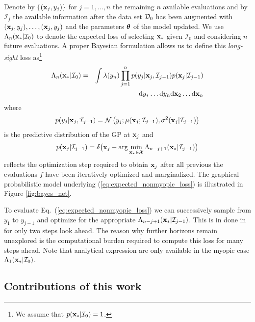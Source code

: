 \documentclass[twoside]{article}
\newcommand{\I}{\mathcal{I}}
\newcommand{\ud}{\mathrm{d}}
\begin{document}
Denote by $\{(\mathbf{x}_j,y_j)\}$ for $j=1,\dots,n$ the remaining $n$ available evaluations and by $\I_j$ the available information after the data set $\mathcal{D}_0$ has been augmented with $(\mathbf{x}_j,y_j),\dots,(\mathbf{x}_j,y_j)$ and the parameters $\boldsymbol{\theta}$ of the model updated. We use $\Lambda_n(\latentVector_*|\I_0 )$ to denote the expected loss of selecting $\mathbf{x}_*$ given $\I_0$ and  considering $n$ future evaluations.  A proper Bayesian formulation allows us to define this \emph{long-sight} loss  \citep{osborne_bayesian_2010}  as\footnote{We assume that $p(\latentVector_*|\I_0)=1$.}
\begin{eqnarray}\nonumber
\Lambda_n(\latentVector_*|\I_0 ) &= & \int \lambda(y_n) \prod_{j=1}^{n}p(y_{j}|\latentVector_{j},\I_{j-1}) p(\latentVector_{j}|\I_{j-1})\\\label{eq:expected_nonmyopic_loss}
& & \ud y_*\dots \ud y_n \ud\latentVector_2\dots \ud\latentVector_n
\end{eqnarray}
where 
$$p(y_{j}|\latentVector_{j},\I_{j-1})= \mathcal{N} \left(y_{j};\mu(\latentVector_{j};\I_{j-1}),\sigma^2(\latentVector_{j}|\I_{j-1} ) \right)$$ 
is the predictive distribution of the GP at $\mathbf{x}_{j}$  and 
$$p(\latentVector_{j}|\I_{j-1}) = \delta \bigr(\latentVector_{j} - \arg \min_{\latentVector_* \in {\mathcal X}} \Lambda_{n-j+1}(\latentVector_*|\I_{j-1})\bigl)$$ 
reflects the optimization step required to obtain $\mathbf{x}_{j}$ after all previous the evaluations $f$ have been iteratively optimized and marginalized.  The graphical probabilistic model underlying (\ref{eq:expected_nonmyopic_loss}) is illustrated in Figure \ref{fig:bayes_net}.

To evaluate Eq.~(\ref{eq:expected_nonmyopic_loss}) we can successively sample from $y_1$ to $y_{j-1}$ and optimize for the appropriate $\Lambda_{n-j+1}(\latentVector_*|\I_{j-1})$. This is in done in \citep{osborne_bayesian_2010} for only two steps look ahead. The reason why further horizons remain unexplored is the  computational burden required to compute this loss for many steps ahead. Note that analytical expression are only available in the myopic case $\Lambda_1(\latentVector_*| \I_0)$.

\subsection{Contributions of this work}
\end{document}
